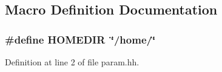 \subsection{Macro Definition Documentation}
\hypertarget{param_8hh_abd012aab0d5d08997f31c0eeedebb40d}{
\subsubsection[{H\+O\+M\+E\+D\+I\+R}]{\setlength{\rightskip}{0pt plus 5cm}\#define H\+O\+M\+E\+D\+I\+R~\char`\"{}/home/\char`\"{}}}\label{param_8hh_abd012aab0d5d08997f31c0eeedebb40d}


Definition at line 2 of file param.\+hh.

